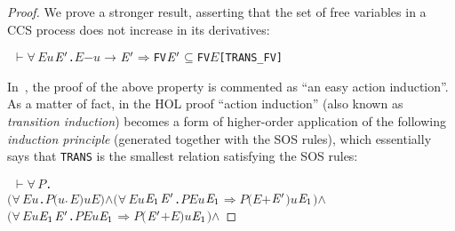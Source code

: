 \documentclass[GCNS]{yincog}
\renewcommand{\HOLinline}[1]{\mbox{\textup{\texttt{#1}}}}
\renewcommand{\HOLConst}[1]{\texttt{#1}}
\renewcommand{\HOLBoundVar}[1]{\ensuremath{\mathit{#1}}}
\renewcommand{\HOLSymConst}[1]{#1}
\renewcommand{\HOLTokenConj}{\ensuremath{\wedge}}
\renewcommand{\HOLTokenSubset}{\ensuremath{\subseteq}}
\renewcommand{\HOLTokenForall}{\ensuremath{\forall \,}}
\renewcommand{\HOLTokenTurnstile}{\ensuremath{\:\:\vdash}}
\theoremstyle{remark}
\theoremstyle{theorem}
\theoremstyle{remark}
\newcommand{\HOLTokenTransBegin}{$-$}
\newcommand{\HOLTokenTransEnd}{$\rightarrow$\xspace}
\renewcommand{\HOLTokenImp}{\ensuremath{\Longrightarrow}}
\begin{document}
\begin{proof}
We prove a stronger result, asserting that the set of free variables in
a CCS process does not increase in its derivatives:
%
\begin{alltt}
\HOLTokenTurnstile{} \HOLSymConst{\HOLTokenForall{}}\HOLBoundVar{E} \HOLBoundVar{u} \ensuremath{\HOLBoundVar{E}\sp{\prime}}. \HOLBoundVar{E} \HOLTokenTransBegin\HOLBoundVar{u}\HOLTokenTransEnd \ensuremath{\HOLBoundVar{E}\sp{\prime}} \HOLSymConst{\HOLTokenImp{}} \HOLConst{FV} \ensuremath{\HOLBoundVar{E}\sp{\prime}} \HOLSymConst{\HOLTokenSubset{}} \HOLConst{FV} \HOLBoundVar{E}\hfill{[TRANS\_FV]}
\end{alltt}

In~\cite{milner1990operational}, the proof of the above property is commented
as ``an easy action induction''. As a matter of fact, in the HOL proof
``action induction'' (also known as \emph{transition induction}) becomes
a form of higher-order application of the following
\emph{induction principle} (generated together with the SOS rules), which
essentially says that \HOLinline{\HOLConst{TRANS}} is the smallest relation
satisfying the SOS rules:
%
\begin{alltt}
\HOLTokenTurnstile{} \HOLSymConst{\HOLTokenForall{}}\HOLBoundVar{P}.
       \ensuremath{(}\HOLSymConst{\HOLTokenForall{}}\HOLBoundVar{E} \HOLBoundVar{u}. \HOLBoundVar{P} \ensuremath{(}\HOLBoundVar{u}\HOLSymConst{\ensuremath{\ldotp}}\HOLBoundVar{E}\ensuremath{)} \HOLBoundVar{u} \HOLBoundVar{E}\ensuremath{)} \HOLSymConst{\HOLTokenConj{}} \ensuremath{(}\HOLSymConst{\HOLTokenForall{}}\HOLBoundVar{E} \HOLBoundVar{u} \ensuremath{\HOLBoundVar{E}\sb{\mathrm{1}}} \ensuremath{\HOLBoundVar{E}\sp{\prime}}. \HOLBoundVar{P} \HOLBoundVar{E} \HOLBoundVar{u} \ensuremath{\HOLBoundVar{E}\sb{\mathrm{1}}} \HOLSymConst{\HOLTokenImp{}} \HOLBoundVar{P} \ensuremath{(}\HOLBoundVar{E} \HOLSymConst{\ensuremath{+}} \ensuremath{\HOLBoundVar{E}\sp{\prime}}\ensuremath{)} \HOLBoundVar{u} \ensuremath{\HOLBoundVar{E}\sb{\mathrm{1}}}\ensuremath{)} \HOLSymConst{\HOLTokenConj{}}
       \ensuremath{(}\HOLSymConst{\HOLTokenForall{}}\HOLBoundVar{E} \HOLBoundVar{u} \ensuremath{\HOLBoundVar{E}\sb{\mathrm{1}}} \ensuremath{\HOLBoundVar{E}\sp{\prime}}. \HOLBoundVar{P} \HOLBoundVar{E} \HOLBoundVar{u} \ensuremath{\HOLBoundVar{E}\sb{\mathrm{1}}} \HOLSymConst{\HOLTokenImp{}} \HOLBoundVar{P} \ensuremath{(}\ensuremath{\HOLBoundVar{E}\sp{\prime}} \HOLSymConst{\ensuremath{+}} \HOLBoundVar{E}\ensuremath{)} \HOLBoundVar{u} \ensuremath{\HOLBoundVar{E}\sb{\mathrm{1}}}\ensuremath{)} \HOLSymConst{\HOLTokenConj{}}

\end{alltt}
\end{proof}
\end{document}
